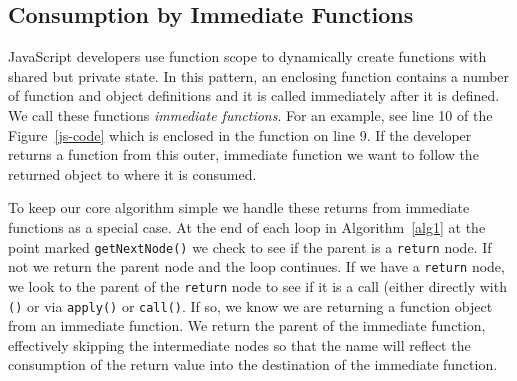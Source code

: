\documentclass[10pt, preprint]{sigplanconf}
\begin{document}
\begin{table}
\centering
{}
\caption{Nodes produce identifiers in the function object consumption summary. Identifiers with a star in the table can be expressions as well as simple identifiers; we explain how we reduce expressions to pseudo-identifier in ~\ref{sec:general-element-naming}.}
\label{table:node-types} 
\end{table}

\subsection{Consumption by Immediate Functions}
\label{sec:immediate}
JavaScript developers use function scope to dynamically create functions with shared but private state. In this pattern, an enclosing function contains a number of function and object definitions and it is called immediately after it is defined. We call these functions \textit{immediate functions}.  For an example, see line 10 of the Figure~\ref{js-code} which is enclosed in the function on line 9. If the developer returns a function from this outer, immediate function we want to follow the returned object to where it is consumed. 

To keep our core algorithm simple we handle these returns from immediate functions as a special case. At the end of each loop in Algorithm~\ref{alg1} at the point marked \verb|getNextNode()| we check to see if the parent is a \verb|return| node.  If not we return the parent node and the loop continues. If we have a \verb|return| node, we look to the parent of the \verb|return| node to see if it is a call (either directly with \verb|()| or via \verb|apply()| or \verb|call()|. If so, we know we are returning a function object from an immediate function.  We return the parent of the immediate function, effectively skipping the intermediate nodes so that the name will reflect the consumption of the return value into the destination of the immediate function.
\end{document}
